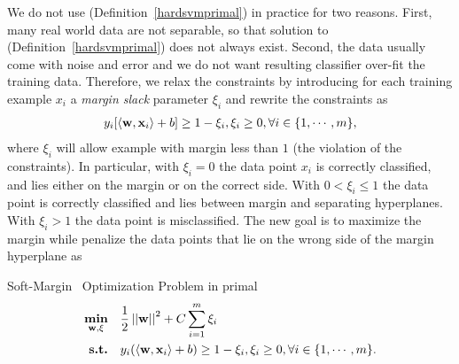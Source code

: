 We do not use (Definition~\ref{hardsvmprimal}) in practice for two reasons. 
First, many real world data are not separable, so that solution to (Definition~\ref{hardsvmprimal}) does not always exist.
Second, the data usually come with noise and error and we do not want resulting classifier over-fit the training data.
Therefore, we relax the constraints by introducing for each training example $x_i$ a \textit{margin slack} parameter $\xi_i$ and rewrite the constraints as 
\begin{align*}
	y_i[\langle \mathbf {w}, \mathbf {x}_i \rangle + b] \ge 1-\xi_i, \xi_i\ge 0, \forall i\in\{1,\cdots,m\},
\end{align*}
where $\xi_i$ will allow example with margin less than $1$ (the violation of the constraints).
In particular, with $\xi_i=0$ the data point $x_i$ is correctly classified, and lies either on the margin or on the correct side.
With $0<\xi_i\le 1$ the data point is correctly classified and lies between margin and separating hyperplanes.
With $\xi_i>1$ the data point is misclassified.
The new goal is to maximize the margin while penalize the data points that lie on the wrong side of the margin hyperplane as
\begin{definition}{Soft-Margin \svm\ Optimization Problem in primal}\label{softsvmprimal}
	\begin{align*}
		\underset{\mathbf {w},\xi}{\textbf{min}} & \quad\frac{1}{2}\left|\left| \mathbf {w} \right|\right|^2 + C\sum_{i=1}^{m}\xi_i\\
		\textbf{s.t.} & \quad y_i(\langle \mathbf {w}, \mathbf {x}_i \rangle + b) \ge 1-\xi_i, \xi_i\ge 0, \forall i\in\{1,\cdots,m\}.
	\end{align*}
\end{definition}



